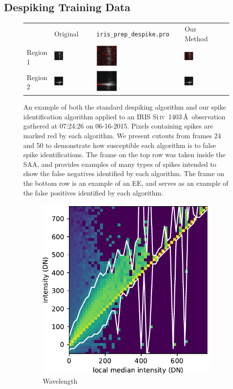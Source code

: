 \documentclass[10pt,letterpaper]{article}
\newcommand{\SiIV}{Si\,\textsc{iv}~1403\,\AA}
\newcommand{\tilewidth}{0.25\textwidth}
\newcommand{\EE}{\ac{EE}}
\newcommand{\SAA}{\ac{SAA}}
\begin{document}
		\subsection{Despiking Training Data}	\label{sec_dspk}	
			
			\begin{figure}[b!]
	
				\renewcommand{\arraystretch}{0}
				\setlength{\tabcolsep}{0pt}
				\begin{tabular}{m{} m{\tilewidth} m{\tilewidth} m{\tilewidth} @{}m{0pt}@{}}
					& \centering Original & \centering \texttt{iris\_prep\_despike.pro} & \centering Our Method & \\[5mm]
					Region 1 & \includegraphics[width=\tilewidth]{fig/orig_1} & \includegraphics[width=\tilewidth]{fig/despike_1} & \includegraphics[width=\tilewidth]{fig/dspk_1} & \\
					Region 2 & \includegraphics[width=\tilewidth]{fig/orig_2} & \includegraphics[width=\tilewidth]{fig/despike_2} & \includegraphics[width=\tilewidth]{fig/dspk_2} & \\
				\end{tabular}
				
				\caption{An example of both the standard despiking algorithm and our spike identification algorithm applied to an IRIS \SiIV\ observation gathered at 07:24:26 on 06-16-2015.
					Pixels containing spikes are marked red by each algorithm.
					We present cutouts from frames 24 and 50 to demonstrate how susceptible each algorithm is to false spike identifications. 
					The frame on the top row was taken inside the \SAA, and provides examples of many types of spikes intended to show the false negatives identified by each algorithm.
					The frame on the bottom row is an example of an \EE, and serves as an example of the false positives identified by each algorithm.}
				
				\label{dspk_ex}
				
			\end{figure}
			
			\begin{figure}[t!]
				\centering
				\begin{subfigure}[t]{0.288\textwidth}
					\centering
					\includegraphics[width=\textwidth]{fig/hist_0}
					\caption{Wavelength}
				\end{subfigure}
				~ 
				\begin{subfigure}[t]{0.288\textwidth}
					\centering
	
\end{subfigure}
\end{figure}
\end{document}
